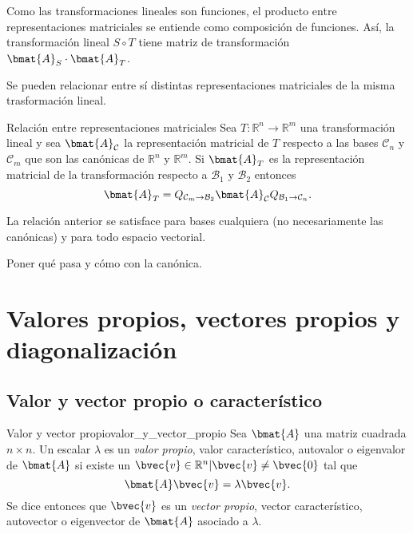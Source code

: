 \documentclass{fmbnotes}
\begin{document}
\begin{tip}
	Como las transformaciones lineales son funciones, el producto entre representaciones matriciales se entiende como composición de funciones. Así, la transformación lineal \(S\circ T\) tiene matriz de transformación \(\bmat{A}_S\cdot \bmat{A}_T\).
\end{tip}

Se pueden relacionar entre sí distintas representaciones matriciales de la misma trasformación lineal.

\begin{teorema}{Relación entre representaciones matriciales}{}
	Sea \(T\colon\mathbb{R}^{n}\to\mathbb{R}^{m}\) una transformación lineal y sea \(\bmat{A}_\mathcal{C}\) la representación matricial de \(T\) respecto a las bases \(\mathcal{C}_n\) y \(\mathcal{C}_m\) que son las canónicas de \(\mathbb{R}^{n}\) y \(\mathbb{R}^{m}\). Si \(\bmat{A}_T\) es la representación matricial de la transformación respecto a \(\mathcal{B}_1\) y \(\mathcal{B}_2\) entonces
	\[\bmat{A}_T=Q_{\mathcal{C}_m\to\mathcal{B}_2}\bmat{A}_\mathcal{C}Q_{\mathcal{B}_1\to\mathcal{C}_n}.\]
\end{teorema}

La relación anterior se satisface para bases cualquiera (no necesariamente las canónicas) y para todo espacio vectorial.

\textcolor{red!80!black}{Poner qué pasa y cómo con la canónica.}

\section{Valores propios, vectores propios y diagonalización}

\subsection{Valor y vector propio o característico}

\begin{definicion}{Valor y vector propio}{valor_y_vector_propio}
	Sea \(\bmat{A}\) una matriz cuadrada \(n\times n\). Un escalar \(\lambda\) es un \emph{valor propio}, valor característico, autovalor o eigenvalor de \(\bmat{A}\) si existe un \(\bvec{v} \in\mathbb{R}^{n}|\bvec{v}\neq\bvec{0} \) tal que
	\[ \bmat{A} \bvec{v}=\lambda \bvec{v}.\]
	Se dice entonces que \(\bvec{v}\) es un \emph{vector propio}, vector característico, autovector o eigenvector de \(\bmat{A}\) asociado a \(\lambda\).
\end{definicion} 
\end{document}
